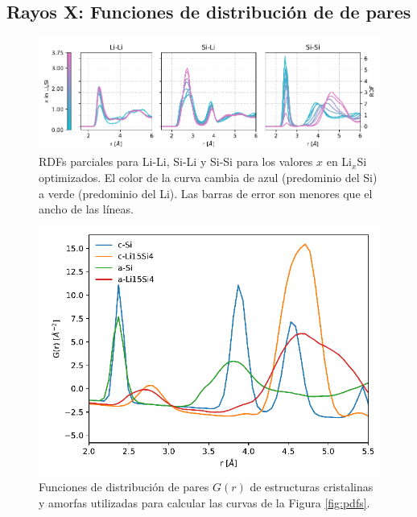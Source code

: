 \subsection{Rayos X: Funciones de distribución de de pares}

\begin{figure}[h!]
    \centering
    \includegraphics[width=\textwidth]{Silicio/prediccion/resultados/xray/prdfs.png}
    \caption{RDFs parciales para Li-Li, Si-Li y Si-Si para los valores $x$ en 
    Li$_x$Si optimizados. El color de la curva cambia de azul (predominio del Si)
    a verde (predominio del Li). Las barras de error son menores que el ancho de 
    las líneas.}
    \label{fig:prdfs}
\end{figure}

\begin{figure}[h!]
    \centering
    \includegraphics[width=.7\textwidth]{Silicio/prediccion/resultados/xray/gofrs.png}
    \caption{Funciones de distribución de pares $G(r)$ de estructuras 
    cristalinas y amorfas utilizadas para calcular las curvas de la Figura 
    \ref{fig:pdfs}.}
    \label{fig:gofrs}
\end{figure}

